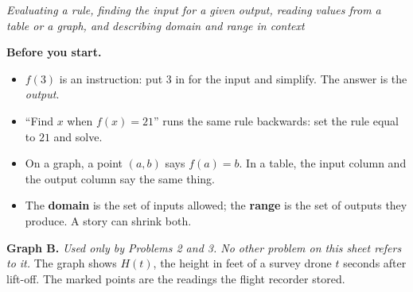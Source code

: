 \documentclass[12pt]{article}
\begin{document}

\begin{center}
\textit{Evaluating a rule, finding the input for a given output, reading values
from a table or a graph, and describing domain and range in context}
\end{center}

\noindent\textbf{Before you start.}
\begin{itemize}[leftmargin=1.2cm, itemsep=2pt, topsep=2pt]
\item $f(3)$ is an instruction: put $3$ in for the input and simplify. The
answer is the \emph{output}.
\item ``Find $x$ when $f(x) = 21$'' runs the same rule backwards: set the rule
equal to $21$ and solve.
\item On a graph, a point $(a, b)$ says $f(a) = b$. In a table, the input
column and the output column say the same thing.
\item The \textbf{domain} is the set of inputs allowed; the \textbf{range} is
the set of outputs they produce. A story can shrink both.
\end{itemize}

\bigskip
\noindent\textbf{Graph B.} \textit{Used only by Problems 2 and 3. No other
problem on this sheet refers to it.} The graph shows $H(t)$, the height in feet
of a survey drone $t$ seconds after lift-off. The marked points are the
readings the flight recorder stored.

\begin{center}
\end{center}

\bigskip


\end{document}
